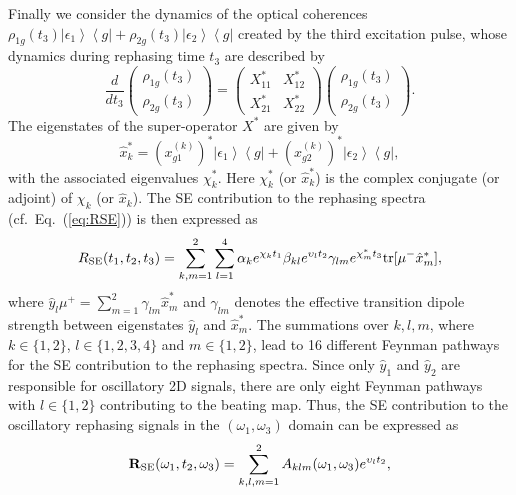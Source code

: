\documentclass[%
 reprint,%
 amssymb, amsmath,%
 aip,cha,%
]{revtex4-1}
\newcommand{\bra}[1]{\ensuremath{\left\langle{#1}\right\vert}}
\newcommand{\ket}[1]{\ensuremath{\left|{#1}\right\rangle}}
\begin{document}
Finally we consider the dynamics of the optical coherences $\rho_{1g}(t_3)\ket{\epsilon_1}\bra{g}+\rho_{2g}(t_3)\ket{\epsilon_2}\bra{g}$ created by the third excitation pulse, whose dynamics during rephasing time $t_3$ are described by
\begin{equation}
\frac{d}{dt_3}
\begin{pmatrix}
	\rho_{1g}(t_3) \\ \rho_{2g}(t_3)
\end{pmatrix}
=
\begin{pmatrix}
	X_{11}^{*} & X_{12}^{*} \\ X_{21}^{*} & X_{22}^{*}
\end{pmatrix}
\begin{pmatrix}
	\rho_{1g}(t_3) \\ \rho_{2g}(t_3)
\end{pmatrix}.
\end{equation}
The eigenstates of the super-operator $X^{*}$ are given by
\begin{equation}
	\hat{x}_{k}^{*}=\left(x_{g1}^{(k)}\right)^{*}\ket{\epsilon_1}\bra{g}+\left(x_{g2}^{(k)}\right)^{*}\ket{\epsilon_2}\bra{g},
\end{equation}
with the associated eigenvalues $\chi_{k}^{*}$.  Here $\chi_{k}^{*}$ (or $\hat{x}_{k}^{*}$) is the complex conjugate (or adjoint) of $\chi_k$ (or $\hat{x}_k$). The SE contribution to the rephasing spectra (cf.~Eq.~(\ref{eq:RSE})) is then expressed as
\begin{align}
	R_{\rm SE}(t_1,t_2,t_3)=\sum_{k,m=1}^{2}\sum_{l=1}^{4}\alpha_{k}e^{\chi_{k}t_1}\beta_{kl}e^{\upsilon_l t_2}\gamma_{lm}e^{\chi_{m}^{*}t_3}{\rm tr}[\mu^{-}\hat{x}_{m}^{*}],
\end{align}
where $\hat{y}_{l}\mu^{+}=\sum_{m=1}^{2}\gamma_{lm}\hat{x}_{m}^{*}$ and $\gamma_{lm}$ denotes the effective transition dipole strength between eigenstates $\hat{y}_{l}$ and $\hat{x}_{m}^{*}$. The summations over $k,l,m$, where $k\in\{1,2\}$, $l\in\{1,2,3,4\}$ and $m\in\{1,2\}$, lead to 16 different Feynman pathways for the SE contribution to the rephasing spectra. Since only $\hat{y}_{1}$ and $\hat{y}_{2}$ are responsible for oscillatory 2D signals, there are only eight Feynman pathways with $l\in\{1,2\}$ contributing to the beating map. Thus, the SE contribution to the oscillatory rephasing signals in the $(\omega_1,\omega_3)$ domain can be expressed as
\begin{equation}
	{\bf R}_{\rm SE}(\omega_1,t_2,\omega_3)=\sum_{k,l,m=1}^{2}A_{klm}(\omega_1,\omega_3)e^{\upsilon_l t_2},
\end{equation}
\end{document}
